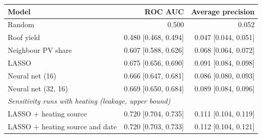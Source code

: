 \begin{tabular}{p{3.4cm}rr}
\toprule
Model & ROC AUC & Average precision \\
\midrule
Random & 0.500 & 0.052 \\
Roof yield & 0.480 [0.468, 0.494] & 0.047 [0.044, 0.051] \\
Neighbour PV share & 0.607 [0.588, 0.626] & 0.068 [0.064, 0.072] \\
LASSO & 0.675 [0.656, 0.690] & 0.091 [0.084, 0.098] \\
Neural net (16) & 0.666 [0.647, 0.681] & 0.086 [0.080, 0.093] \\
Neural net (32, 16) & 0.669 [0.650, 0.684] & 0.089 [0.084, 0.096] \\
\midrule
\multicolumn{3}{l}{\textit{Sensitivity runs with heating (leakage, upper bound)}} \\
LASSO + heating source & 0.720 [0.704, 0.735] & 0.111 [0.104, 0.119] \\
LASSO + heating source and date & 0.720 [0.703, 0.733] & 0.112 [0.104, 0.121] \\
\bottomrule
\end{tabular}
